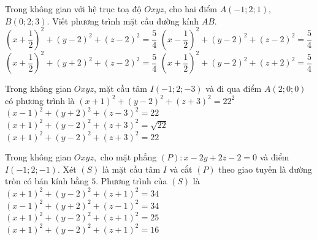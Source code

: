 \begin{ex}%
	Trong không gian với hệ trục toạ độ $Oxyz$, cho hai điểm $A\left(-1;2;1\right)$, $B\left(0;2;3\right)$. Viết phương trình mặt cầu đường  kính $AB$.
	\choice 
		 {\True $\left(x+\dfrac{1}{2}\right)^2+\left(y-2\right)^2+\left(z-2\right)^2=\dfrac{5}{4}$}
		{$\left(x-\dfrac{1}{2}\right)^2+\left(y-2\right)^2+\left(z-2\right)^2=\dfrac{5}{4}$} 
		 {$\left(x+\dfrac{1}{2}\right)^2+\left(y+2\right)^2+\left(z-2\right)^2=\dfrac{5}{4}$}
		{$\left(x+\dfrac{1}{2}\right)^2+\left(y-2\right)^2+\left(z+2\right)^2=\dfrac{5}{4}$} 
\end{ex}

\begin{ex}%
	Trong không gian $Oxyz$, mặt cầu tâm $I(-1;  2;-3)$ và đi qua điểm $A(2;0;0)$ có phương trình là
	\choice 
		 {$(x+1)^2+(y-2)^2+(z+3)^2 = 22^2$}
		{$(x-1)^2+(y+2)^2+(z-3)^2 = 22$} 
		{$(x+1)^2+(y-2)^2+(z+3)^2 = \sqrt{22}$} 
		{\True $(x+1)^2+(y-2)^2+(z+3)^2 = 22$} 
\end{ex}

\begin{ex}%
	Trong không gian $Oxyz,$ cho mặt phẳng $(P)\colon x-2y+2z-2=0$ và điểm $I\left(-1;2;-1\right)$. Xét $(S)$ là mặt cầu tâm $I$ và cắt $(P)$ theo giao tuyến là  đường tròn có bán kính bằng $5$. Phương trình của $(S)$ là
	 \choice
		{$\left(x+1\right)^2+\left(y-2\right)^2+\left(z+1\right)^2=34$} 
		 {$\left(x-1\right)^2+\left(y+2\right)^2+\left(z-1\right)^2=34$}
		{$\left(x+1\right)^2+\left(y-2\right)^2+\left(z+1\right)^2=25$} 
		 {$\left(x+1\right)^2+\left(y-2\right)^2+\left(z+1\right)^2=16$}
\end{ex}


